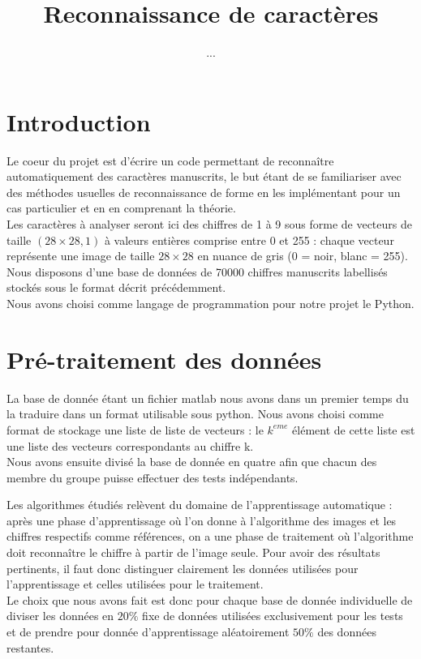 \documentclass[a4paper,11pt,twoside]{report}
\author{...}
\title{Reconnaissance de caractères}
\begin{document}
 
\maketitle 



\chapter{Introduction}

Le coeur du projet est d'écrire un code permettant de reconnaître automatiquement des caractères manuscrits, le but étant de se familiariser avec des méthodes usuelles de reconnaissance de forme en les implémentant pour un cas particulier et en en comprenant la théorie. \\


Les caractères à analyser seront ici des chiffres de 1 à 9 sous forme de vecteurs de taille $(28\times28,1)$ à valeurs entières comprise entre 0 et 255 : chaque vecteur représente une image de taille $28\times28$ en nuance de gris (0 = noir, blanc = 255). Nous disposons d'une base de données de 70000 chiffres manuscrits labellisés stockés sous le format décrit précédemment.\\
 
Nous avons choisi comme langage de programmation pour notre projet le Python.

\chapter{Pré-traitement des données}
La base de donnée étant un fichier matlab nous avons dans un premier temps du la traduire dans un format utilisable sous python. Nous avons choisi comme format de stockage une liste de liste de vecteurs : le $k^{eme}$ élément de cette liste est une liste des vecteurs correspondants au chiffre k.\\
Nous avons ensuite divisé la base de donnée en quatre afin que chacun des membre du groupe puisse effectuer des tests indépendants. 

Les algorithmes étudiés relèvent du domaine de l'apprentissage automatique : après une phase d'apprentissage où l'on donne à l'algorithme des images et les chiffres respectifs comme références, on a une phase de traitement où l'algorithme doit reconnaître le chiffre à partir de l'image seule. Pour avoir des résultats pertinents, il faut donc distinguer clairement les données utilisées pour l'apprentissage et celles utilisées pour le traitement.\\Le choix que nous avons fait est donc pour chaque base de donnée individuelle de diviser les données en $20\%$ fixe de données utilisées exclusivement pour les tests et de prendre pour donnée d'apprentissage aléatoirement $50\%$ des données restantes.
\end{document}
